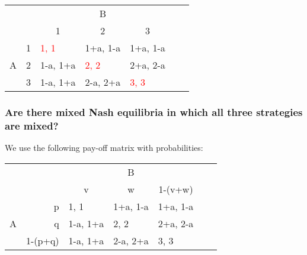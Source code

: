 \documentclass[11pt]{article}
\begin{document}
    \begin{table}[h]
        \centering
        \begin{tabular}{lllllll}
            & & \multicolumn{3}{c}{B} & & \\
            &                        & \multicolumn{1}{c}{1}                      & \multicolumn{1}{c}{2}                      & \multicolumn{1}{c}{3}                      & & \\ \cline{3-5}
            \multirow{3}{*}{A} & \multicolumn{1}{r|}{1} & \multicolumn{1}{l|}{\textcolor{red}{1, 1}} & \multicolumn{1}{l|}{1+a, 1-a} & \multicolumn{1}{l|}{1+a, 1-a} &  &  \\ \cline{3-5}
            & \multicolumn{1}{l|}{2} & \multicolumn{1}{l|}{1-a, 1+a}              & \multicolumn{1}{l|}{\textcolor{red}{2, 2}} & \multicolumn{1}{l|}{2+a, 2-a} & & \\ \cline{3-5}
            & \multicolumn{1}{l|}{3} & \multicolumn{1}{l|}{1-a, 1+a}              & \multicolumn{1}{l|}{2-a, 2+a} & \multicolumn{1}{l|}{\textcolor{red}{3, 3}} & & \\ \cline{3-5}
        \end{tabular}
    \end{table}

    \subsubsection{Are there mixed Nash equilibria in which all three strategies are mixed?}
    We use the following pay-off matrix with probabilities:

    \begin{table}[h]
        \centering
        \begin{tabular}{lllllll}
            & & \multicolumn{3}{c}{B} & & \\
            &                              & \multicolumn{1}{c}{v}         & \multicolumn{1}{c}{w}         & \multicolumn{1}{c}{1-(v+w)}   & & \\ \cline{3-5}
            \multirow{3}{*}{A} & \multicolumn{1}{r|}{p}       & \multicolumn{1}{l|}{1, 1}     & \multicolumn{1}{l|}{1+a, 1-a} & \multicolumn{1}{l|}{1+a, 1-a} &  &  \\ \cline{3-5}
            & \multicolumn{1}{r|}{q}       & \multicolumn{1}{l|}{1-a, 1+a} & \multicolumn{1}{l|}{2, 2}     & \multicolumn{1}{l|}{2+a, 2-a} & & \\ \cline{3-5}
            & \multicolumn{1}{l|}{1-(p+q)} & \multicolumn{1}{l|}{1-a, 1+a} & \multicolumn{1}{l|}{2-a, 2+a} & \multicolumn{1}{l|}{3, 3} & & \\ \cline{3-5}
        \end{tabular}
    \end{table}
\end{document}
